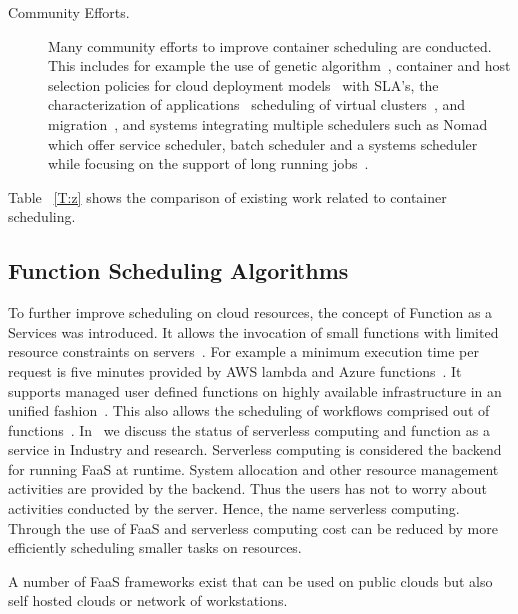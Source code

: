 \documentclass[final,5p,times,twocolumn]{elsarticle}
\begin{document}
\begin{description}
\item[Community Efforts.] Many community efforts to improve
container scheduling are conducted. This includes for example the use
of genetic algorithm~\cite{guerrero2018genetic}, container and host
selection policies for cloud deployment models~\cite{hanafy2017novel}
with SLA's, the characterization of
applications~\cite{medel2017client} scheduling of virtual
clusters~\cite{dziurzanskivalue}, and migration~\cite{Flocker2018},
and systems integrating multiple schedulers such as Nomad which offer
service scheduler, batch scheduler and a systems scheduler while
focusing on the support of long running jobs~\cite{Nomad2018}.

\end{description}


Table ~\ref{T:z} shows the comparison of existing work related to
container scheduling. 











\subsection{Function Scheduling Algorithms}
\label{sec:faas}



To further improve scheduling on cloud resources, the concept of
Function as a Services was introduced.  It allows the invocation of
small functions with limited resource constraints on
servers~\cite{lasbook}. For example a minimum execution time per
request is five minutes provided by AWS lambda and Azure
functions~\cite{ServerlessComputing2018}. It supports managed user
defined functions on highly available infrastructure in an unified
fashion~\cite{nastic2017serverless}. This also allows the scheduling of
workflows comprised out of
functions~\cite{alqaryouti2018serverless}. In~\cite{fox2017status} we
discuss the status of serverless computing and function as a service
in Industry and research.  Serverless computing is considered the
backend for running FaaS at runtime. System allocation and other
resource management activities are provided by the backend. Thus the
users has not to worry about activities conducted by the
server. Hence, the name serverless computing. Through the use of FaaS
and serverless computing cost can be reduced by more efficiently
scheduling smaller tasks on resources.

A number of FaaS frameworks exist that can be used on public clouds
but also self hosted clouds or network of workstations.
\end{document}
